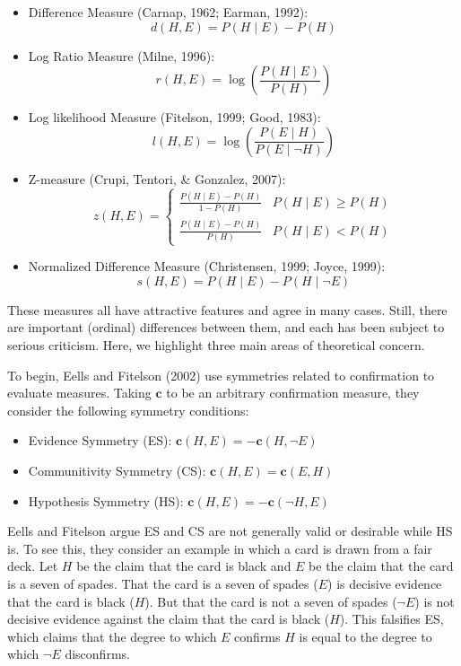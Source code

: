 \documentclass[10pt, letterpaper]{article}
\begin{document}
\begin{itemize}
\item
  Difference Measure (Carnap, 1962; Earman, 1992):
  \[d(H,E)=P(H \mid E)-P(H)\]
\item
  Log Ratio Measure (Milne, 1996):
  \[r(H,E)=\log\left(\frac{P(H \mid E)}{P(H)}\right)\]
\item
  Log likelihood Measure (Fitelson, 1999; Good, 1983):
  \[l(H,E)=\log\left(\frac{P(E \mid H)}{P(E \mid \neg H)}\right)\]
\item
  Z-measure (Crupi, Tentori, \& Gonzalez, 2007): \[
  z(H,E) = \begin{cases}
  \frac{P(H \mid E) - P(H)}{1-P(H)}  &  P(H \mid E) \geq P(H) \\
  \frac{P(H \mid E) - P(H)}{P(H)} & P(H \mid E) < P(H)
  \end{cases}
  \]
\item
  Normalized Difference Measure (Christensen, 1999; Joyce, 1999):
  \[s(H,E)=P(H \mid E)-P(H \mid \neg E)\]
\end{itemize}

These measures all have attractive features and agree in many cases.
Still, there are important (ordinal) differences between them, and each
has been subject to serious criticism. Here, we highlight three main
areas of theoretical concern.

To begin, Eells and Fitelson (2002) use symmetries related to
confirmation to evaluate measures. Taking \(\mathbf{c}\) to be an
arbitrary confirmation measure, they consider the following symmetry
conditions:

\begin{itemize}
\item
  Evidence Symmetry (ES): \(\mathbf{c}(H,E)=-\mathbf{c}(H, \neg E)\)
\item
  Communitivity Symmetry (CS): \(\mathbf{c}(H,E)=\mathbf{c}(E, H)\)
\item
  Hypothesis Symmetry (HS): \(\mathbf{c}(H,E)= -\mathbf{c}(\neg H, E)\)
\end{itemize}

Eells and Fitelson argue ES and CS are not generally valid or desirable
while HS is. To see this, they consider an example in which a card is
drawn from a fair deck. Let \(H\) be the claim that the card is black
and \(E\) be the claim that the card is a seven of spades. That the card
is a seven of spades (\(E\)) is decisive evidence that the card is black
(\(H\)). But that the card is not a seven of spades (\(\neg E\)) is not
decisive evidence against the claim that the card is black (\(H\)). This
falsifies ES, which claims that the degree to which \(E\) confirms \(H\)
is equal to the degree to which \(\neg E\) disconfirms.
\end{document}
